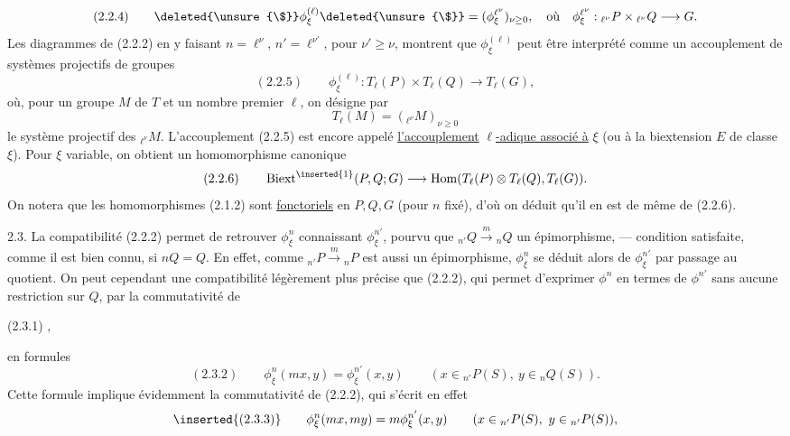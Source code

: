 
\[
(2.2.4)\qquad\deleted{\unsure{\$}}\phi^{(\ell)}_\xi\deleted{\unsure{\$}}=(\phi^{\ell^\nu}_\xi)_{\nu\geq0},\quad\text{où}\quad\phi^{\ell^\nu}_\xi:{}_{\ell^\nu}P\times{}_{\ell^\nu}Q\longrightarrow G.
\]
Les diagrammes  de (2.2.2) en y faisant $n=\ell^\nu$, $n'=\ell^{\nu'}$, pour $\nu'\geq\nu$, montrent que $\phi^{(\ell)}_\xi$ peut être interprété comme un accouplement de  systèmes projectifs de groupes
\[
(2.2.5)\qquad\phi^{(\ell)}_\xi:T_\ell(P)\times T_\ell(Q)\longrightarrow T_\ell(G),
\]
où, pour un groupe $M$ de $T$ et un nombre premier $\ell$, on désigne par
\[
T_\ell(M)=({}_{\ell^\nu}M)_{\nu\geq0}
\]
le système projectif des ${}_{\ell^\nu}M$. L'accouplement \deleted{\unsure{\$}} (2.2.5) est encore appelé \uline{l'accouplement} $\ell$\uline{-adique associé à} $\xi$ (ou à la biextension $E$ de classe $\xi$). Pour $\xi$ variable, on obtient un homomorphisme canonique
\[
(2.2.6)\qquad\operatorname{Biext}^{\inserted{1}}(P,Q;G)\longrightarrow\operatorname{Hom}(T_\ell(P)\otimes T_\ell(Q),T_\ell(G)).
\]
On notera que les homomorphismes (2.1.2) sont \uline{fonctoriels} en $P,Q,G$ (pour $n$ fixé), d'où on déduit qu'il en est de même de (2.2.6).


2.3.  La compatibilité (2.2.2) permet de retrouver $\phi^n_\xi$ connaissant $\phi^{n'}_\xi$, pourvu que ${}_{n'}Q\xrightarrow{m}{}_nQ$  un épimorphisme, ---  condition satisfaite, comme il est bien connu, si $nQ=Q$. En effet, comme ${}_{n'}P\xrightarrow{m}{}_nP$ est aussi un épimorphisme, $\phi^n_\xi$ se déduit alors de $\phi^{n'}_\xi$ par passage au quotient. On peut cependant  une compatibilité légèrement plus précise que (2.2.2), qui permet d'exprimer $\phi^n$ en termes de $\phi^{n'}$ sans aucune restriction sur $Q$, par la commutativité de

(2.3.1)
,

en formules
\[
(2.3.2)\qquad\phi^n_\xi(mx,y)=\phi^{n'}_\xi(x,y)\qquad(x\in{}_{n'}P(S),\ y\in{}_nQ(S)).
\]
Cette formule implique évidemment la commutativité de (2.2.2), qui s'écrit en effet
\[
\inserted{(2.3.3)}\qquad\phi^n_\xi(mx,my)=m\phi^{n'}_\xi(x,y)\qquad(x\in{}_{n'}P(S),\ y\in{}_{n'}P(S)),
\]
